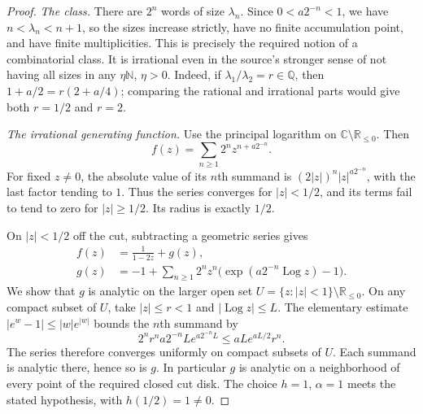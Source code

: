 \documentclass[10pt]{article}
\begin{document}
\begin{proof}
\emph{The class.}
There are \(2^n\) words of size \(\lambda_n\). Since
\(0<a2^{-n}<1\), we have \(n<\lambda_n<n+1\), so the sizes
increase strictly, have no finite accumulation point, and have
finite multiplicities. This is precisely the required notion of a
combinatorial class. It is irrational even in the source's stronger
sense of not having all sizes in any \(\eta\mathbb N\), \(\eta>0\).
Indeed, if \(\lambda_1/\lambda_2=r\in\mathbb Q\), then
\(1+a/2=r(2+a/4)\); comparing the rational and irrational parts
would give both \(r=1/2\) and \(r=2\).

\emph{The irrational generating function.}
Use the principal logarithm on \(\mathbb C\setminus\mathbb R_{\le0}\).
Then
\[
 f(z)=\sum_{n\ge1}2^n z^{n+a2^{-n}}.
\]
For fixed \(z\ne0\), the absolute value of its \(n\)th summand is
\((2|z|)^n |z|^{a2^{-n}}\), with the last factor tending to \(1\).
Thus the series converges for \(|z|<1/2\), and its terms fail to
tend to zero for \(|z|\ge1/2\). Its radius is exactly \(1/2\).

On \(|z|<1/2\) off the cut, subtracting a geometric series gives
\begin{align*}
 f(z)&=\frac{1}{1-2z}+g(z),\\
 g(z)&=-1+\sum_{n\ge1}2^n z^n
              \bigl(\exp(a2^{-n}\operatorname{Log}z)-1\bigr).
\end{align*}
We show that \(g\) is analytic on the larger open set
\(U=\{z:|z|<1\}\setminus\mathbb R_{\le0}\).
On any compact subset of \(U\), take \(|z|\le r<1\) and
\(|\operatorname{Log}z|\le L\). The elementary estimate
\(|e^w-1|\le |w|e^{|w|}\) bounds the \(n\)th summand by
\[
 2^n r^n a2^{-n}L e^{a2^{-n}L}
 \le aL e^{aL/2}r^n.
\]
The series therefore converges uniformly on compact subsets of
\(U\). Each summand is analytic there, hence so is \(g\).
In particular \(g\) is analytic on a neighborhood of every point
of the required closed cut disk. The choice \(h=1\), \(\alpha=1\)
meets the stated hypothesis, with \(h(1/2)=1\ne0\).


\end{proof}
\end{document}
